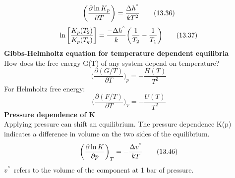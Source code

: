 \documentclass[8pt]{article}
\numberwithin{equation}{section}
\begin{document}
\begin{multicols}{2}
\begin{equation}
\bigg(\frac{\partial \ln{K_{p}}}{\partial T}\bigg)=\frac{\Delta h^{\degree}}{kT^{2}} \tag{13.36}
\end{equation}
\begin{equation}
\ln{\bigg[\frac{K_{p}(T_{2})}{K_{p}(T_{q})} \bigg]}=\frac{-\Delta h^{\degree}}{k}\bigg(\frac{1}{T_{2}}-\frac{1}{T_{1}}\bigg) \tag{13.37}
\end{equation}
\textbf{Gibbs-Helmholtz equation for temperature dependent equilibria} \\
How does the free energy G(T) of any system depend on temperature? \\\begin{equation}
\bigg(\frac{\partial(G/T)}{\partial T} \bigg)_{p}=-\frac{H(T)}{T^{2}} \tag{13.41}
\end{equation}
For Helmholtz free energy: 
\begin{equation}
\bigg(\frac{\partial(F/T)}{\partial T} \bigg)_{V}=-\frac{U(T)}{T^{2}} \tag{13.42}
\end{equation}
\textbf{Pressure dependence of K} \\
Applying pressure can shift an equilibrium. The pressure dependence K(p) indicates a difference in volume on the two sides of the equilibrium. 
\begin{equation}
\bigg(\frac{\partial\ln{K}}{\partial p}\bigg)_{T}=-\frac{\Delta v^{\degree}}{kT} \tag{13.46}
\end{equation}
$v^{\degree}$ refers to the volume of the component at 1 bar of pressure. 

\end{multicols}
\end{document}
